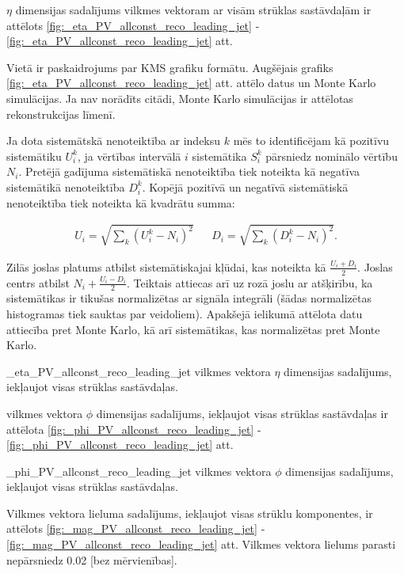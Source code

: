 $\eta$ dimensijas sadalījums vilkmes vektoram ar visām strūklas sastāvdaļām ir attēlots \ref{fig:_eta_PV_allconst_reco_leading_jet} - \ref{fig:_eta_PV_allconst_reco_leading_jet} att.

Vietā ir paskaidrojums par KMS grafiku formātu. Augšējais grafiks \ref{fig:_eta_PV_allconst_reco_leading_jet} att. attēlo datus un Monte Karlo simulācijas. Ja nav norādīts citādi, Monte Karlo simulācijas ir attēlotas rekonstrukcijas līmenī.

Ja dota sistemātskā nenoteiktība ar indeksu $k$ mēs to identificējam kā pozitīvu sistemātiku $U^{k}_{i}$, ja vērtības intervālā $i$ sistemātika $S^{k}_i$ pārsniedz nominālo vērtību $N_{i}$. Pretējā gadījuma sistemātiskā nenoteiktība tiek noteikta kā negatīva sistemātikā nenoteiktība $D^{k}_{i}$. Kopējā pozitīvā un negatīvā sistemātiskā nenoteiktība tiek noteikta kā kvadrātu summa:

\begin{align}
U_{i}=\sqrt{\sum_{k}\left(U^{k}_{i}-N_{i}\right)^{2}} && D_{i}=\sqrt{\sum_{k}\left(D^{k}_{i}-N_{i}\right)^{2}}.
\end{align}

Zilās joslas platums atbilst sistemātiskajai kļūdai, kas noteikta kā $\frac{U_{i}+D_{i}}{2}$. Joslas centrs atbilst $N_{i} + \frac{U_{i}-D_{i}}{2}$. Teiktais attiecas arī uz rozā joslu ar atšķirību, ka sistemātikas ir tikušas normalizētas ar signāla integrāli (šādas normalizētas histogramas tiek sauktas par \gls{veidoliem}). Apakšejā ielikumā attēlota datu attiecība pret Monte Karlo, kā arī sistemātikas, kas normalizētas pret Monte Karlo.

          {_eta_PV_allconst_reco_leading_jet}
          {\leadingjet vilkmes vektora $\eta$ dimensijas sadalījums, iekļaujot visas strūklas sastāvdaļas.}

\leadingjet vilkmes vektora  $\phi$ dimensijas sadalījums, iekļaujot visas strūklas sastāvdaļas ir attēlota \ref{fig:_phi_PV_allconst_reco_leading_jet} - \ref{fig:_phi_PV_allconst_reco_leading_jet} att. 

          {_phi_PV_allconst_reco_leading_jet}
          {\leadingjet vilkmes vektora $\phi$ dimensijas sadalījums, iekļaujot visas strūklas sastāvdaļas.}

Vilkmes vektora lieluma sadalījums, iekļaujot visas strūklu komponentes, ir attēlots \ref{fig:_mag_PV_allconst_reco_leading_jet} - \ref{fig:_mag_PV_allconst_reco_leading_jet} att. Vilkmes vektora lielums parasti nepārsniedz 0.02 [bez mērvienības].

